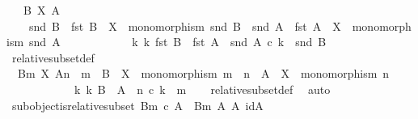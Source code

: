 \begin{isabellebody}
\ \ \ {\isachardoublequoteopen}B\ {\isasymsubseteq}\isactrlbsub X\isactrlesub \ A\ \ {\isasymlongleftrightarrow}\ \isanewline
\ \ \ \ {\isacharparenleft}{\kern0pt}snd\ B\ {\isacharcolon}{\kern0pt}\ fst\ B\ {\isasymrightarrow}\ X\ {\isasymand}\ monomorphism\ {\isacharparenleft}{\kern0pt}snd\ B{\isacharparenright}{\kern0pt}\ {\isasymand}\ snd\ A\ {\isacharcolon}{\kern0pt}\ fst\ A\ {\isasymrightarrow}\ X\ {\isasymand}\ monomorphism\ {\isacharparenleft}{\kern0pt}snd\ A{\isacharparenright}{\kern0pt}\isanewline
\ \ \ \ \ \ \ \ \ \ {\isasymand}\ {\isacharparenleft}{\kern0pt}{\isasymexists}\ k{\isachardot}{\kern0pt}\ k{\isacharcolon}{\kern0pt}\ fst\ B\ {\isasymrightarrow}\ fst\ A\ {\isasymand}\ snd\ A\ {\isasymcirc}\isactrlsub c\ k\ {\isacharequal}{\kern0pt}\ snd\ B{\isacharparenright}{\kern0pt}{\isacharparenright}{\kern0pt}{\isachardoublequoteclose}\isanewline
\isanewline
{}\isamarkupfalse%
\ relative{\isacharunderscore}{\kern0pt}subset{\isacharunderscore}{\kern0pt}def{}{\isacharcolon}{\kern0pt}\ \isanewline
\ \ {\isachardoublequoteopen}{\isacharparenleft}{\kern0pt}B{\isacharcomma}{\kern0pt}m{\isacharparenright}{\kern0pt}\ {\isasymsubseteq}\isactrlbsub X\isactrlesub \ {\isacharparenleft}{\kern0pt}A{\isacharcomma}{\kern0pt}n{\isacharparenright}{\kern0pt}\ {\isacharequal}{\kern0pt}\ {\isacharparenleft}{\kern0pt}m\ {\isacharcolon}{\kern0pt}\ B\ {\isasymrightarrow}\ X\ {\isasymand}\ monomorphism\ m\ {\isasymand}\ n\ {\isacharcolon}{\kern0pt}\ A\ {\isasymrightarrow}\ X\ {\isasymand}\ monomorphism\ n\isanewline
\ \ \ \ \ \ \ \ \ \ {\isasymand}\ {\isacharparenleft}{\kern0pt}{\isasymexists}\ k{\isachardot}{\kern0pt}\ k{\isacharcolon}{\kern0pt}\ B\ {\isasymrightarrow}\ A\ {\isasymand}\ n\ {\isasymcirc}\isactrlsub c\ k\ {\isacharequal}{\kern0pt}\ m{\isacharparenright}{\kern0pt}{\isacharparenright}{\kern0pt}{\isachardoublequoteclose}\isanewline
%
\isadelimproof
\ \ %
\endisadelimproof
%
\isatagproof
{}\isamarkupfalse%
\ relative{\isacharunderscore}{\kern0pt}subset{\isacharunderscore}{\kern0pt}def\ \isamarkupfalse%
\ auto%
\endisatagproof
{\isafoldproof}%
%
\isadelimproof
\isanewline
%
\endisadelimproof
\isanewline
{}\isamarkupfalse%
\ subobject{\isacharunderscore}{\kern0pt}is{\isacharunderscore}{\kern0pt}relative{\isacharunderscore}{\kern0pt}subset{\isacharcolon}{\kern0pt}\ {\isachardoublequoteopen}{\isacharparenleft}{\kern0pt}B{\isacharcomma}{\kern0pt}m{\isacharparenright}{\kern0pt}\ {\isasymsubseteq}\isactrlsub c\ A\ {\isasymlongleftrightarrow}\ {\isacharparenleft}{\kern0pt}B{\isacharcomma}{\kern0pt}m{\isacharparenright}{\kern0pt}\ {\isasymsubseteq}\isactrlbsub A\isactrlesub \ {\isacharparenleft}{\kern0pt}A{\isacharcomma}{\kern0pt}\ id{\isacharparenleft}{\kern0pt}A{\isacharparenright}{\kern0pt}{\isacharparenright}{\kern0pt}{\isachardoublequoteclose}\isanewline

\end{isabellebody}
